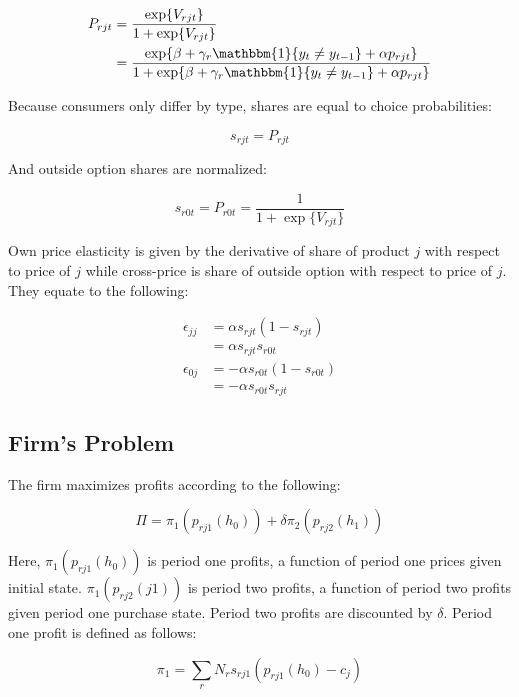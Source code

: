 \begin{align*}
  P_{rjt} &= \frac{\exp\{V_{rjt}\}}{1 + \exp\{V_{rjt}\}} \\
  &= \frac{\exp\{\beta + \gamma_r\mathbbm{1}\{y_t\ne y_{t-1}\} + \alpha
  p_{rjt}\}}{1 + \exp\{\beta + \gamma_r\mathbbm{1}\{y_t\ne y_{t-1}\} + \alpha
  p_{rjt}\}}
\end{align*}

Because consumers only differ by type, shares are equal to choice probabilities:

\begin{equation}
  s_{rjt} = P_{rjt}
\end{equation}

And outside option shares are normalized:

\begin{equation}
  s_{r0t} = P_{r0t} = \frac{1}{1 + \exp\{V_{rjt}\}}
\end{equation}

Own price elasticity is given by the derivative of share of product $j$ with respect to price of $j$
while cross-price is share of outside option with respect to price of $j$. They
equate to the following:

\begin{align*}
  \epsilon_{jj} &= \alpha s_{rjt}(1-s_{rjt}) \\
  &= \alpha s_{rjt}s_{r0t} \\
  \epsilon_{0j} &= -\alpha s_{r0t}(1-s_{r0t}) \\
  &= -\alpha s_{r0t}s_{rjt}
\end{align*}

\subsection{Firm's Problem}
\label{subsec:firm-problem}

The firm maximizes profits according to the following:

\begin{equation}
  \Pi = \pi_1(p_{rj1}(h_0)) + \delta\pi_2(p_{rj2}(h_1))
\end{equation}

Here, $\pi_1(p_{rj1}(h_0))$ is period one profits, a function of period one prices
given initial state. $\pi_1(p_{rj2}(j1))$ is period two profits, a function of
period two profits given period one purchase state. Period two profits are
discounted by $\delta$. Period one profit is defined as follows:

\begin{equation}
  \pi_1 = \sum_rN_rs_{rj1}(p_{rj1}(h_0) - c_j)
\end{equation}

